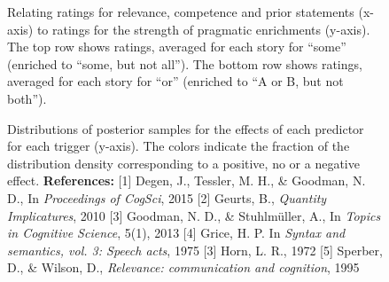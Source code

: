 \documentclass[11pt,letterpaper]{article}
\begin{document}


\begin{figure}
 \caption{Relating ratings for relevance, competence and prior statements (x-axis) to
ratings for the strength of pragmatic enrichments (y-axis). The top row shows ratings,
averaged for each story for ``some'' (enriched to ``some, but not all''). The bottom row shows ratings, averaged for each story for ``or'' (enriched to ``A or B, but not both'').}
    \label{by-item-ratings}
\end{figure}

\begin{figure}   
    \caption{Distributions of posterior samples for the effects of each predictor for each trigger (y-axis). The colors indicate the fraction of the distribution density corresponding to a positive, no or a negative effect. \newline \textbf{References:} [1] Degen, J., Tessler, M. H., \& Goodman, N. D., In \textit{Proceedings of CogSci}, 2015 [2] Geurts, B., \textit{Quantity Implicatures}, 2010 [3] Goodman, N. D., \& Stuhlm\"uller, A., In \textit{Topics in Cognitive Science}, 5(1), 2013 [4] Grice, H. P. In \textit{Syntax and semantics, vol. 3: Speech acts}, 1975 [3] Horn, L. R., 1972 [5] Sperber, D., \& Wilson, D., \textit{Relevance: communication and cognition}, 1995  
    }
    \label{posteriors}
\end{figure}
\end{document}
